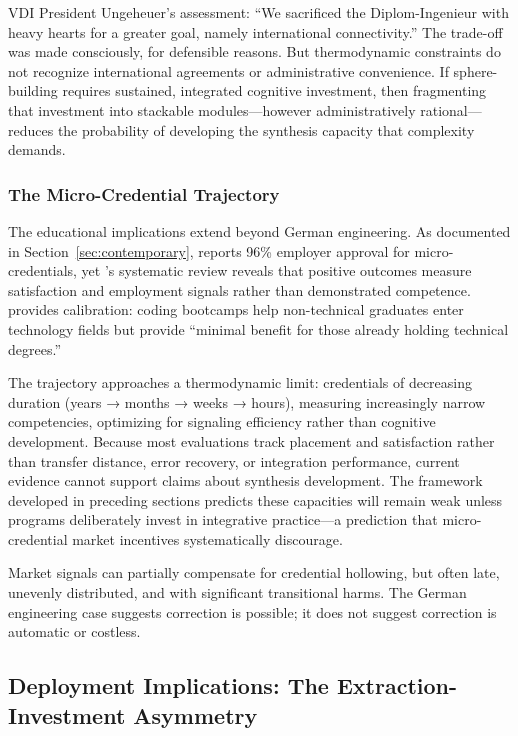 VDI President Ungeheuer's assessment: ``We sacrificed the Diplom-Ingenieur with heavy hearts for a greater goal, namely international connectivity.'' The trade-off was made consciously, for defensible reasons. But thermodynamic constraints do not recognize international agreements or administrative convenience. If sphere-building requires sustained, integrated cognitive investment, then fragmenting that investment into stackable modules—however administratively rational—reduces the probability of developing the synthesis capacity that complexity demands.

\subsubsection{The Micro-Credential Trajectory}

The educational implications extend beyond German engineering. As documented in Section~\ref{sec:contemporary}, \citet{lumina2025} reports 96\% employer approval for micro-credentials, yet \citet{ha2022}'s systematic review reveals that positive outcomes measure satisfaction and employment signals rather than demonstrated competence. \citet{joshi2019} provides calibration: coding bootcamps help non-technical graduates enter technology fields but provide ``minimal benefit for those already holding technical degrees.''

The trajectory approaches a thermodynamic limit: credentials of decreasing duration (years → months → weeks → hours), measuring increasingly narrow competencies, optimizing for signaling efficiency rather than cognitive development. Because most evaluations track placement and satisfaction rather than transfer distance, error recovery, or integration performance, current evidence cannot support claims about synthesis development. The framework developed in preceding sections predicts these capacities will remain weak unless programs deliberately invest in integrative practice—a prediction that micro-credential market incentives systematically discourage.

Market signals can partially compensate for credential hollowing, but often late, unevenly distributed, and with significant transitional harms. The German engineering case suggests correction is possible; it does not suggest correction is automatic or costless.

\subsection{Deployment Implications: The Extraction-Investment Asymmetry}

